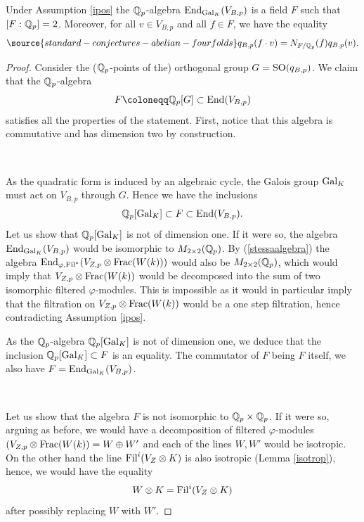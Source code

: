 \begin{prop}
\notready\label{propendo}
Under  Assumption \ref{ipos} the
$\mathbb{Q}_p$-algebra  $\textnormal{End}_{\textnormal{Gal}_K}(V_{B,p})$
is a field $F$ such that  $[F:\mathbb{Q}_p]=2$. Moreover, for all $v\in V_{B,p}$ and all $f\in F$,  we have the equality
\begin{equation} \label{eq:nonso}
\source{standard-conjectures-abelian-fourfolds}
 q_{B,p}(f \cdot v)=N_{F/\Q_p}(f) q_{B,p}(v).
\end{equation}
\end{prop}
\begin{proof}
Consider the ($\mathbb{Q}_p$-points of the) orthogonal  group $G=\textnormal{SO}(q_{B,p})$. We claim that the $\mathbb{Q}_p$-algebra
\[F\coloneqq \Q_p[G]\subset \End (V_{B,p})\]
satisfies all the properties of the statement. First, notice that this algebra is commutative and has dimension two by construction.

\

As the quadratic form is induced by an algebraic cycle, the Galois group $\textnormal{Gal}_K$ must act on $V_{B,p}$ through $G$. Hence we have the inclusions
\[\mathbb{Q}_p[\textnormal{Gal}_K]\subset  F \subset  \textnormal{End} (V_{B,p}).\]
Let us show that $\mathbb{Q}_p[\textnormal{Gal}_K]$ is not of dimension one. If it were so, the algebra $\textnormal{End}_{\textnormal{Gal}_K}(V_{B,p})$ would be isomorphic to $M_{2\times 2}(\mathbb{Q}_p)$. By   (\ref{stessaalgebra}) the algebra $\textnormal{End}_{\varphi,\textnormal{Fil}^*}(V_{Z,p}\otimes \mathrm{Frac}(W(k)))$ would also be $M_{2\times 2}(\mathbb{Q}_p)$, which would imply that $V_{Z,p}\otimes \mathrm{Frac}(W(k))$ would be decomposed into the sum of two isomorphic filtered $\varphi$-modules. This is impossible as it would in particular imply that the filtration on $V_{Z,p}\otimes \mathrm{Frac}(W(k))$ would be a one step filtration, hence contradicting Assumption  \ref{ipos}.

As the $\mathbb{Q}_p$-algebra $\mathbb{Q}_p[\textnormal{Gal}_K]$ is not of dimension one, we deduce that the  inclusion $\mathbb{Q}_p[\textnormal{Gal}_K]\subset  F$ is an equality. The commutator of $F$ being $F$ itself, we also have
$F=\textnormal{End}_{\textnormal{Gal}_K}(V_{B,p})$.

\

Let us show that the algebra $F$ is not isomorphic to $\mathbb{Q}_p \times \mathbb{Q}_p$. If it were so, arguing as before, we would have a decomposition of
filtered $\varphi$-modules
$(V_{Z,p}\otimes \mathrm{Frac}(W(k))= W \oplus W'$ and each of the lines $W, W'$ would be isotropic. On the other hand  the line $\textnormal{Fil}^i(V_Z\otimes K)$ is also isotropic (Lemma \ref{isotrop}), hence, we would have  the equality
\[W\otimes K =\textnormal{Fil}^i(V_Z\otimes K)\]
after possibly replacing $W$ with $W'$.


\end{proof}
